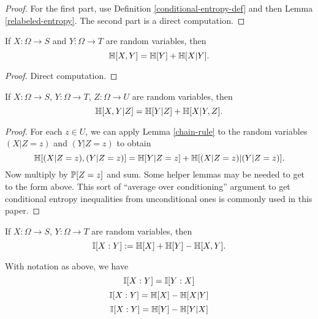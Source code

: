 \begin{proof}
  For the first part, use Definition \ref{conditional-entropy-def} and then Lemma \ref{relabeled-entropy}.  The second part is a direct computation.
\end{proof}


\begin{lemma}\label{chain-rule}
  \leanok
  If $X: \Omega \to S$ and $Y: \Omega \to T$ are random variables, then
  $$ \mathbb{H}[X, Y] = \mathbb{H}[Y] + \mathbb{H}[X|Y].$$
  \end{lemma}
  \begin{proof}
  \leanok
  Direct computation.
\end{proof}

\begin{lemma}\label{conditional-chain-rule}
  \leanok
  If $X: \Omega \to S$, $Y: \Omega \to T$, $Z: \Omega \to U$ are random variables, then
$$ \mathbb{H}[X, Y | Z ] = \mathbb{H}[Y | Z] + \mathbb{H}[X|Y, Z].$$
\end{lemma}

\begin{proof}  \leanok
   For each $z \in U$, we can apply Lemma \ref{chain-rule} to the random variables $(X|Z=z)$ and $(Y|Z=z)$ to obtain
  $$ \mathbb{H}[ (X|Z=z),(Y|Z=z) ] = \mathbb{H}[Y|Z=z] + \mathbb{H}[(X|Z=z)|(Y|Z=z)].$$
  Now multiply by $\mathbb{P}[Z=z]$ and sum.  Some helper lemmas may be needed to get to the form above.  This sort of ``average over conditioning'' argument to get conditional entropy inequalities from unconditional ones is commonly used in this paper.
\end{proof}

\begin{definition}
  \label{information-def}
  \leanok
  If $X: \Omega \to S$, $Y: \Omega \to T$ are random variables, then
  $$\mathbb{I}[X : Y] := \mathbb{H}[X] + \mathbb{H}[Y] - \mathbb{H}[X,Y].$$
\end{definition}

\begin{lemma}
  \label{alternative-mutual}
  \leanok
  With notation as above, we have
  $$  \mathbb{I}[X : Y] = \mathbb{I}[Y:X]$$
  $$  \mathbb{I}[X : Y] = \mathbb{H}[X] - \mathbb{H}[X|Y]$$
  $$  \mathbb{I}[X : Y] = \mathbb{H}[Y] - \mathbb{H}[Y|X]$$
\end{lemma}

